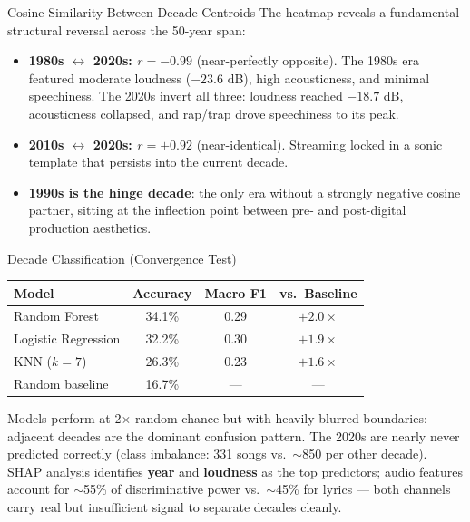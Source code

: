 \documentclass[final]{beamer}
\newlength{\colwidth}
\begin{document}
\begin{frame}[t]
\begin{columns}[t]
\begin{column}{\colwidth}
\begin{block}{Cosine Similarity Between Decade Centroids}
    The heatmap reveals a fundamental structural reversal across the 50-year span:

    \begin{itemize}
      \item \textbf{1980s $\leftrightarrow$ 2020s: $r = -0.99$} (near-perfectly opposite). The 1980s era featured moderate loudness ($-23.6$ dB), high acousticness, and minimal speechiness. The 2020s invert all three: loudness reached $-18.7$ dB, acousticness collapsed, and rap/trap drove speechiness to its peak.
      \item \textbf{2010s $\leftrightarrow$ 2020s: $r = +0.92$} (near-identical). Streaming locked in a sonic template that persists into the current decade.
      \item \textbf{1990s is the hinge decade}: the only era without a strongly negative cosine partner, sitting at the inflection point between pre- and post-digital production aesthetics.
    \end{itemize}

  \end{block}

  \begin{block}{Decade Classification (Convergence Test)}

    \begin{center}
      \begin{tabular}{lccc}
        \toprule
        Model & Accuracy & Macro F1 & vs.\ Baseline \\
        \midrule
        Random Forest       & 34.1\% & 0.29 & $+2.0\times$ \\
        Logistic Regression & 32.2\% & 0.30 & $+1.9\times$ \\
        KNN ($k{=}7$)       & 26.3\% & 0.23 & $+1.6\times$ \\
        \midrule
        Random baseline     & 16.7\% & --- & --- \\
        \bottomrule
      \end{tabular}
    \end{center}

    \smallskip
    Models perform at 2$\times$ random chance but with heavily blurred boundaries: adjacent decades are the dominant confusion pattern. The 2020s are nearly never predicted correctly (class imbalance: 331 songs vs.\ $\sim$850 per other decade). SHAP analysis identifies \textbf{year} and \textbf{loudness} as the top predictors; audio features account for $\sim$55\% of discriminative power vs.\ $\sim$45\% for lyrics --- both channels carry real but insufficient signal to separate decades cleanly.


\end{block}
\end{column}
\end{columns}
\end{frame}
\end{document}

